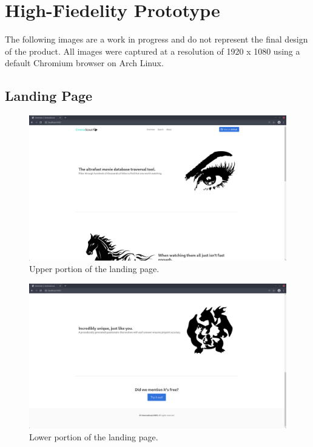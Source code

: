 \documentclass{article}
\begin{document}
\section{High-Fiedelity Prototype}
The following images are a work in progress and do not represent the final
design of the product. All images were captured at a resolution of 1920 x
1080 using a default Chromium browser on Arch Linux.
\subsection{Landing Page}
\begin{figure}[H]
\includegraphics[width=\columnwidth]{res/landing_1.png}
\caption{Upper portion of the landing page.}
\end{figure}
\begin{figure}[H]
\includegraphics[width=\columnwidth]{res/landing_2.png}
\caption{Lower portion of the landing page.}
\end{figure}
\end{document}
